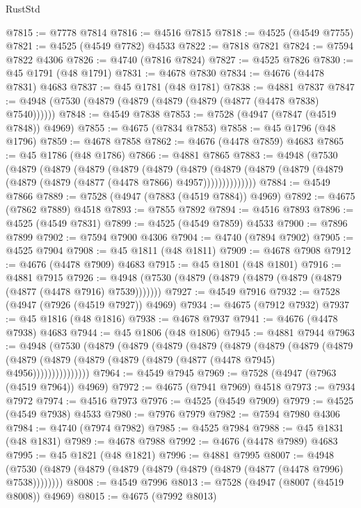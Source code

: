 \begin{lexlean}{RustStd}
\begin{coremodule}
@7815 := @7778 @7814
@7816 := @4516 @7815
@7818 := @4525 (@4549 @7755)
@7821 := @4525 (@4549 @7782) @4533
@7822 := @7818 @7821
@7824 := @7594 @7822 @4306
@7826 := @4740 (@7816 @7824)
@7827 := @4525 @7826
@7830 := @45 @1791 (@48 @1791)
@7831 := @4678 @7830
@7834 := @4676 (@4478 @7831) @4683
@7837 := @45 @1781 (@48 @1781)
@7838 := @4881 @7837
@7847 := @4948 (@7530 (@4879 (@4879 (@4879 (@4879 (@4877 (@4478 @7838) @7540))))))
@7848 := @4549 @7838
@7853 := @7528 (@4947 (@7847 (@4519 @7848)) @4969)
@7855 := @4675 (@7834 @7853)
@7858 := @45 @1796 (@48 @1796)
@7859 := @4678 @7858
@7862 := @4676 (@4478 @7859) @4683
@7865 := @45 @1786 (@48 @1786)
@7866 := @4881 @7865
@7883 := @4948
    (@7530
      (@4879
        (@4879
          (@4879
            (@4879
              (@4879
                (@4879
                  (@4879 (@4879 (@4879 (@4879 (@4879 (@4879 (@4877 (@4478 @7866) @4957))))))))))))))
@7884 := @4549 @7866
@7889 := @7528 (@4947 (@7883 (@4519 @7884)) @4969)
@7892 := @4675 (@7862 @7889) @4518
@7893 := @7855 @7892
@7894 := @4516 @7893
@7896 := @4525 (@4549 @7831)
@7899 := @4525 (@4549 @7859) @4533
@7900 := @7896 @7899
@7902 := @7594 @7900 @4306
@7904 := @4740 (@7894 @7902)
@7905 := @4525 @7904
@7908 := @45 @1811 (@48 @1811)
@7909 := @4678 @7908
@7912 := @4676 (@4478 @7909) @4683
@7915 := @45 @1801 (@48 @1801)
@7916 := @4881 @7915
@7926 := @4948 (@7530 (@4879 (@4879 (@4879 (@4879 (@4879 (@4877 (@4478 @7916) @7539)))))))
@7927 := @4549 @7916
@7932 := @7528 (@4947 (@7926 (@4519 @7927)) @4969)
@7934 := @4675 (@7912 @7932)
@7937 := @45 @1816 (@48 @1816)
@7938 := @4678 @7937
@7941 := @4676 (@4478 @7938) @4683
@7944 := @45 @1806 (@48 @1806)
@7945 := @4881 @7944
@7963 := @4948
    (@7530
      (@4879
        (@4879
          (@4879
            (@4879
              (@4879
                (@4879
                  (@4879
                    (@4879
                      (@4879 (@4879 (@4879 (@4879 (@4879 (@4877 (@4478 @7945) @4956)))))))))))))))
@7964 := @4549 @7945
@7969 := @7528 (@4947 (@7963 (@4519 @7964)) @4969)
@7972 := @4675 (@7941 @7969) @4518
@7973 := @7934 @7972
@7974 := @4516 @7973
@7976 := @4525 (@4549 @7909)
@7979 := @4525 (@4549 @7938) @4533
@7980 := @7976 @7979
@7982 := @7594 @7980 @4306
@7984 := @4740 (@7974 @7982)
@7985 := @4525 @7984
@7988 := @45 @1831 (@48 @1831)
@7989 := @4678 @7988
@7992 := @4676 (@4478 @7989) @4683
@7995 := @45 @1821 (@48 @1821)
@7996 := @4881 @7995
@8007 := @4948 (@7530 (@4879 (@4879 (@4879 (@4879 (@4879 (@4879 (@4877 (@4478 @7996) @7538))))))))
@8008 := @4549 @7996
@8013 := @7528 (@4947 (@8007 (@4519 @8008)) @4969)
@8015 := @4675 (@7992 @8013)

\end{coremodule}
\end{lexlean}
